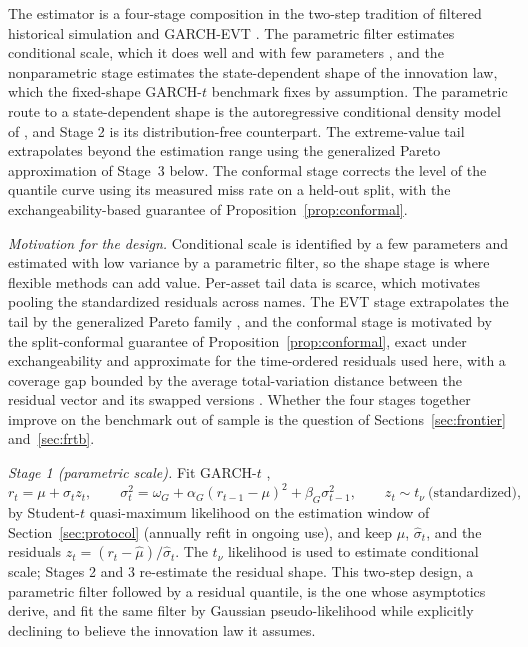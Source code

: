\documentclass[11pt]{article}
\theoremstyle{remark}
\begin{document}
The estimator is a four-stage composition in the two-step tradition of filtered historical simulation and GARCH-EVT \citep{baroneadesi1999fhs, hullwhite1998, mcneilfrey2000}. The parametric
filter estimates conditional scale, which it does well and with few
parameters \citep{andersenbollerslev1998, hansenlunde2005}, and the nonparametric stage estimates the state-dependent
shape of the innovation law, which the fixed-shape GARCH-$t$ benchmark fixes by
assumption. The parametric route to a state-dependent shape is the autoregressive conditional density model of \citet{hansen1994ARCD}, and Stage 2 is its distribution-free counterpart. The extreme-value tail extrapolates beyond the estimation
range using the generalized Pareto approximation of Stage~3 below. The
conformal stage corrects the level of the quantile curve using its
measured miss rate on a held-out split, with the exchangeability-based
guarantee of Proposition~\ref{prop:conformal}.

\noindent\emph{Motivation for the design.} Conditional scale is identified by a few parameters and estimated with low variance by a parametric filter, so the shape stage is where flexible methods can add value. Per-asset tail data is scarce, which motivates pooling the standardized residuals across names. The EVT stage extrapolates the
tail by the generalized Pareto family \citep{balkema1974,
pickands1975}, and the conformal stage is motivated by the
split-conformal guarantee of Proposition~\ref{prop:conformal}, exact
under exchangeability and approximate for the time-ordered residuals
used here, with a coverage gap bounded by the average total-variation distance between the residual vector and its swapped versions \citep{barber2023}. Whether the four stages together improve on the benchmark out of sample is the question of Sections~\ref{sec:frontier} and~\ref{sec:frtb}.

\emph{Stage 1 (parametric scale).} Fit GARCH-$t$ \citep{bollerslev1986, bollerslev1987},
\begin{equation}
r_t = \mu + \sigma_t z_t,\qquad
\sigma_t^2 = \omega_G + \alpha_G (r_{t-1}-\mu)^2 + \beta_G \sigma_{t-1}^2,
\qquad z_t \sim t_\nu \ \text{(standardized)},
\label{eq:garch}
\end{equation}
by Student-$t$ quasi-maximum likelihood on the estimation window of Section~\ref{sec:protocol} (annually refit in ongoing use), and keep
$\widehat{\mu}$, $\widehat{\sigma}_t$, and the residuals
$\widehat{z}_t = (r_t-\widehat{\mu})/\widehat{\sigma}_t$. The $t_\nu$ likelihood is used to estimate conditional scale; Stages 2 and 3 re-estimate the residual shape. This two-step design, a parametric filter followed by a residual quantile, is the one whose asymptotics \citet{francqzakoian2015} derive, and \citet{mcneilfrey2000} fit the same filter by Gaussian pseudo-likelihood while explicitly declining to believe the innovation law it assumes.
\end{document}
